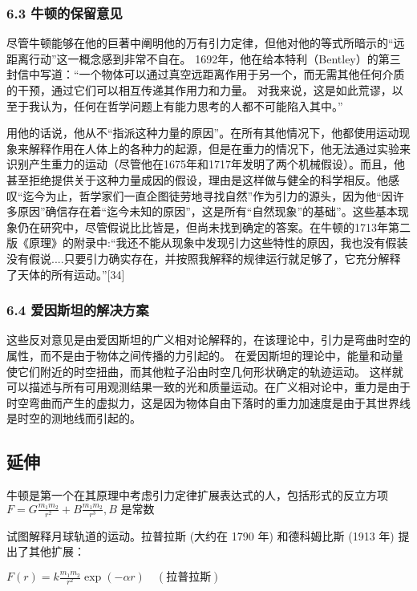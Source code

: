 \subsubsection{6.3 牛顿的保留意见}

尽管牛顿能够在他的巨著中阐明他的万有引力定律，但他对他的等式所暗示的“远距离行动”这一概念感到非常不自在。 1692年，他在给本特利（Bentley）的第三封信中写道：“一个物体可以通过真空远距离作用于另一个，而无需其他任何介质的干预，通过它们可以相互传递其作用力和力量。 对我来说，这是如此荒谬，以至于我认为，任何在哲学问题上有能力思考的人都不可能陷入其中。”

用他的话说，他从不“指派这种力量的原因”。在所有其他情况下，他都使用运动现象来解释作用在人体上的各种力的起源，但是在重力的情况下，他无法通过实验来识别产生重力的运动（尽管他在1675年和1717年发明了两个机械假设）。而且，他甚至拒绝提供关于这种力量成​​因的假设，理由是这样做与健全的科学相反。他感叹“迄今为止，哲学家们一直企图徒劳地寻找自然”作为引力的源头，因为他“因许多原因”确信存在着“迄今未知的原因”，这是所有“自然现象”的基础”。这些基本现象仍在研究中，尽管假说比比皆是，但尚未找到确定的答案。在牛顿的1713年第二版《原理》的附录中:“我还不能从现象中发现引力这些特性的原因，我也没有假装没有假说....只要引力确实存在，并按照我解释的规律运行就足够了，它充分解释了天体的所有运动。”[34]

\subsubsection{6.4 爱因斯坦的解决方案}

这些反对意见是由爱因斯坦的广义相对论解释的，在该理论中，引力是弯曲时空的属性，而不是由于物体之间传播的力引起的。 在爱因斯坦的理论中，能量和动量使它们附近的时空扭曲，而其他粒子沿由时空几何形状确定的轨迹运动。 这样就可以描述与所有可用观测结果一致的光和质量运动。在广义相对论中，重力是由于时空弯曲而产生的虚拟力，这是因为物体自由下落时的重力加速度是由于其世界线是时空的测地线而引起的。

\subsection{延伸}

牛顿是第一个在其原理中考虑引力定律扩展表达式的人，包括形式的反立方项
$F = G \frac{m_1 m_2}{r^2} + B \frac{m_1 m_2}{r^3} , B \text{ 是常数}$

试图解释月球轨道的运动。拉普拉斯 (大约在 1790 年) 和德科姆比斯 (1913 年) 提出了其他扩展：

$F(r) = k \frac{m_1 m_2}{r^2} \exp(-\alpha r) \quad (\text{拉普拉斯})$

